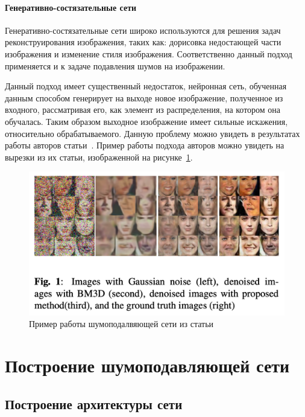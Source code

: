 \subsubsection{Генеративно-состязательные сети}

Генеративно-состязательные сети широко используются для решения задач реконструирования изображения, таких как: дорисовка недостающей части изображения и изменение стиля изображения. Соответственно данный подход применяется и к задаче подавления шумов на изображении.

Данный подход имеет существенный недостаток, нейронная сеть, обученная данным способом генерирует на выходе новое изображение, полученное из входного, рассматривая его, как элемент из распределения, на котором она обучалась. Таким образом выходное изображение имеет сильные искажения, относительно обрабатываемого. Данную проблему можно увидеть в результатах работы авторов статьи~\autocite{DenseNetPaper}. Пример работы подхода авторов можно увидеть на вырезки из их статьи, изображенной на рисунке~\ref{fig:example_from_denoising_gan_paper}.


\begin{figure}[h]
	\centering
	\includegraphics[width=\textwidth]{img/example_from_denoising_gan_paper}
	\caption{Пример работы шумоподалвяющей сети из статьи~\autocite{DenseNetPaper}}
	\label{fig:example_from_denoising_gan_paper}
\end{figure}

\chapter{Построение шумоподавляющей сети}

\section{Построение архитектуры сети}

